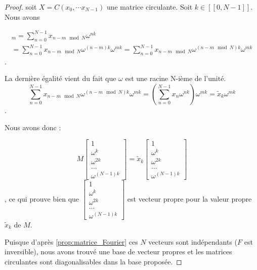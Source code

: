 \documentclass[11pt,oneside]{article}
\begin{document}
\begin{proof}

soit $X = C(x_0, \cdots x_{N-1})$ une matrice circulante. Soit $k \in [\![0,N-1]\!]$. Nous avons  

\begin{align*}
[M \begin{bmatrix}
1 \\
\omega^{k} \\
\omega^{2k}\\
... \\
\omega^{(N-1)k}
\end{bmatrix}]_m = \sum_{n=0}^{N-1} x_{n-m \mod N} \omega^{nk}  \\
= \sum_{n=0}^{N-1} x_{n-m \mod N} \omega^{(n - m)k} \omega^{mk} 
= \sum_{n=0}^{N-1} x_{n-m \mod N} \omega^{(n - m \mod N)k}\omega^{mk}
\end{align*}. 

La dernière égalité vient du fait que  $\omega$ est une racine N-ième de l'unité.
$$\sum_{n=0}^{N-1} x_{n-m \mod N} \omega^{(n - m \mod N)k} \omega^{mk} =  (\sum_{n=0}^{N-1} x_{n} \omega^{nk}) \omega^{mk} = \tilde x_k \omega^{mk}$$.




Nous avons donc : 

$$
M \begin{bmatrix}
1 \\
\omega^{k} \\
\omega^{2k}\\
... \\
\omega^{(N-1)k}
\end{bmatrix} 
= \tilde x_k \begin{bmatrix}
1 \\
\omega^{k} \\
\omega^{2k}\\
... \\
\omega^{(N-1)k}
\end{bmatrix}
$$,
ce qui prouve bien que $\begin{bmatrix}
1 \\
\omega^{k} \\
\omega^{2k}\\
... \\
\omega^{(N-1)k}
\end{bmatrix} $ 
est vecteur propre pour la valeur propre $\tilde x_k$ de $M$. 

Puisque d'après \ref{prop:matrice_Fourier} ces $N$ vecteurs sont indépendants ($F$ est inversible), nous avons trouvé une base de vecteur propres et les matrices circulantes sont diagonalisables dans la base proposée. 


\end{proof}
\end{document}
